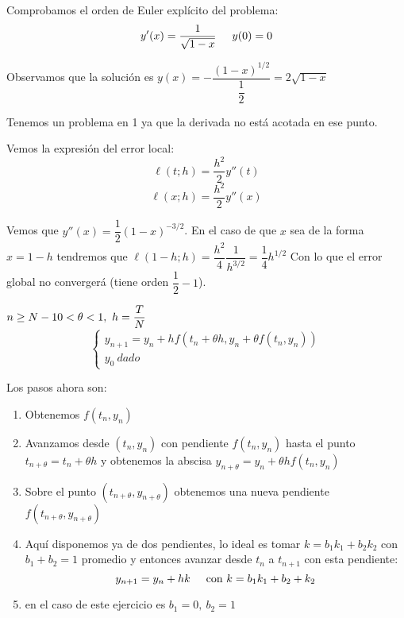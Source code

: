 \documentclass[openany]{book}
\begin{document}
    \setcounter{ex}{11}

    \begin{exercise}
        Comprobamos el orden de Euler explícito del problema: 
        $$ y'(x) = \dfrac{1}{\sqrt{1-x}} \hspace{5mm} y(0) = 0 $$

        Observamos que la solución es $ y(x) = -\dfrac{(1-x)^{1/2}}{\dfrac{1}{2}} = 2 \sqrt{1-x} $

        Tenemos un problema en 1 ya que la derivada no está acotada en ese punto.


        
        Vemos la expresión del error local:
        $$ \ell(t;h) = \dfrac{h^2}{2} y''(t) $$
        $$ \ell(x;h) = \dfrac{h^2}{2} y''(x) $$
        
        Vemos que $ y''(x) = \dfrac{1}{2}(1-x)^{-3/2} $. En el caso de que $ x $ sea de la forma $ x = 1-h $ tendremos que $ \ell(1-h;h) = \dfrac{h^2}{4} \dfrac{1}{h^{3/2}} = \dfrac{1}{4} h ^{1/2}$
        Con lo que el error global no convergerá (tiene orden $ \dfrac{1}{2}-1 $).


    \end{exercise}

    \begin{exercise}
        $ n\geq N-1\\ 0 < \theta < 1,\ h=\dfrac{T}{N} $
        $$ \left\{
        \begin{array}{l}
            y_{n+1} = y_n+h f(t_n+ \theta h, y_n+ \theta f(t_n,y_n) )\\
            y_0\ dado
        \end{array}
        \right. $$

        Los pasos ahora son:
        \begin{enumerate}
            \item Obtenemos $ f(t_n,y_n) $
            \item Avanzamos desde $ (t_n,y_n) $ con pendiente $ f(t_n,y_n) $ hasta el punto $ t_{n+\theta} = t_n+ \theta h $ y obtenemos la abscisa $ y_{n+\theta} = y_n+\theta hf(t_n,y_n) $
            \item Sobre el punto $ (t_{n+\theta},y_{n+\theta}) $ obtenemos una nueva pendiente $ f(t_{n+\theta},y_{n+\theta}) $
            \item Aquí disponemos ya de dos pendientes, lo ideal es tomar $ k = b_1k_1+b_2k_2  $ con $ b_1+b_2 = 1 $ promedio y entonces avanzar desde $ t_n $ a $ t_{n+1} $ con esta pendiente:
                $$ y_{n+1} = y_n + hk \hspace{5mm} \text{con } k = b_1k_1+b_2+k_2 $$
            \item en el caso de este ejercicio es $ b_1 = 0,\ b_2 = 1 $ 


        \end{enumerate}
    
    \end{exercise}
\end{document}
